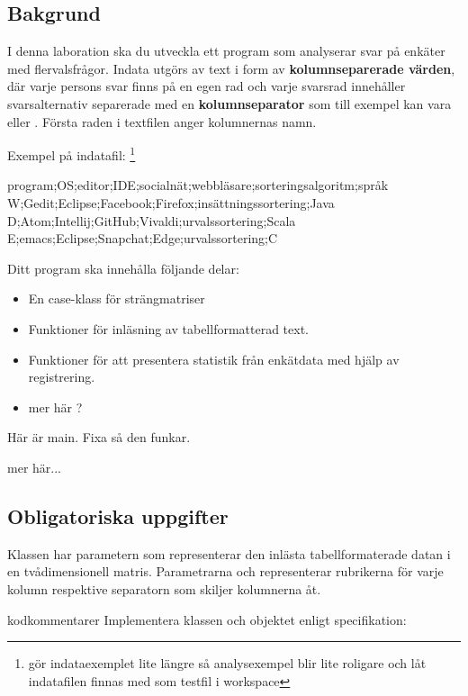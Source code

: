 \subsection{Bakgrund}

I denna laboration ska du utveckla ett program som analyserar svar på enkäter med flervalsfrågor. Indata utgörs av text i form av \textbf{kolumnseparerade värden}, där varje persons svar finns på en egen rad och varje svarsrad innehåller svarsalternativ separerade med en \textbf{kolumnseparator} som till exempel kan vara \code{;} eller \code{\t}. Första raden i textfilen anger kolumnernas namn.

Exempel på indatafil: \footnote{\TODO gör indataexemplet lite längre så analysexempel blir lite roligare och låt indatafilen finnas med som testfil i workspace}
\begin{CodeSmall}[language=, ]
program;OS;editor;IDE;socialnät;webbläsare;sorteringsalgoritm;språk
W;Gedit;Eclipse;Facebook;Firefox;insättningssortering;Java
D;Atom;Intellij;GitHub;Vivaldi;urvalssortering;Scala
E;emacs;Eclipse;Snapchat;Edge;urvalssortering;C
\end{CodeSmall}

Ditt program ska innehålla följande delar:
\begin{itemize}
\item En case-klass för strängmatriser 
\item Funktioner för inläsning av tabellformatterad text.
\item Funktioner för att presentera statistik från enkätdata med hjälp av registrering.
\item \TODO mer här ?
\end{itemize}


Här är main. Fixa så den funkar.


\TODO mer här...

\subsection{Obligatoriska uppgifter}

Klassen  har parametern  som representerar den inlästa tabellformaterade datan i en tvådimensionell matris. Parametrarna  och  representerar rubrikerna för varje kolumn respektive separatorn som skiljer kolumnerna åt.

\TODO kodkommentarer
\Task Implementera klassen  och objektet  enligt specifikation:

